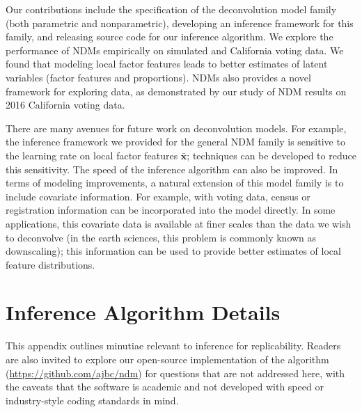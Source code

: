 \documentclass[twoside,11pt]{article}
\begin{document}
Our contributions include the specification of the deconvolution model family (both parametric and nonparametric), developing an inference framework for this family, and releasing source code for our inference algorithm.  We explore the performance of NDMs empirically on simulated and California voting data.  We found that modeling local factor features leads to better estimates of latent variables (factor features and proportions).  NDMs also provides a novel framework for exploring data, as demonstrated by our study of NDM results on 2016 California voting data.

There are many avenues for future work on deconvolution models.  For example, the inference framework we provided for the general NDM family is sensitive to the learning rate on local factor features $\boldsymbol{\bar{x}}$; techniques can be developed to reduce this sensitivity.  The speed of the inference algorithm can also be improved.  In terms of modeling improvements, a natural extension of this model family is to include covariate information.  For example, with voting data, census or registration information can be incorporated into the model directly.  In some applications, this covariate data is available at finer scales than the data we wish to deconvolve (in the earth sciences, this problem is commonly known as downscaling); this information can be used to provide better estimates of local feature distributions.









\appendix
{}

\section{Inference Algorithm Details}
This appendix outlines minutiae relevant to inference for replicability.  Readers are also invited to explore our open-source implementation of the algorithm (\url{https://github.com/ajbc/ndm}) for questions that are not addressed here, with the caveats that the software is academic and not developed with speed or industry-style coding standards in mind.
\end{document}
